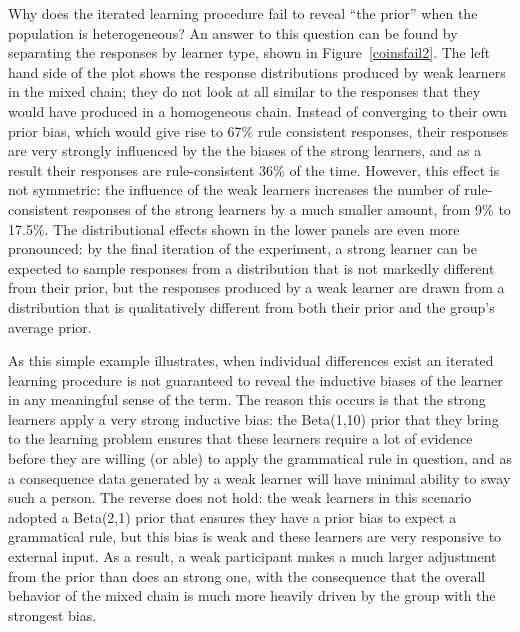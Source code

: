\documentclass[doc]{apa6}
\begin{document}
Why does the iterated learning procedure fail to reveal ``the prior'' when the population is heterogeneous? An answer to this question can be found by separating the responses by learner type, shown in Figure~\ref{coinsfail2}. The left hand side of the plot shows the response distributions produced by {\sc weak} learners in the mixed chain; they do not look at all similar to the responses that they would have produced in a homogeneous chain. Instead of converging to their own prior bias, which would give rise to 67\% rule consistent responses, their responses are very strongly influenced by the the biases of the {\sc strong} learners, and as a result their responses are rule-consistent 36\% of the time. However, this effect is not symmetric: the influence of the {\sc weak} learners increases the number of rule-consistent responses of the {\sc strong} learners by a much smaller amount, from 9\% to 17.5\%. The distributional effects shown in the lower panels are even more pronounced: by the final iteration of the experiment, a {\sc strong} learner can be expected to sample responses from a distribution that is not markedly different from their prior, but the responses produced by a {\sc weak} learner are drawn from a distribution that is qualitatively different from both their prior and the group's average prior.

As this simple example illustrates, when individual differences exist an iterated learning procedure is not guaranteed to reveal the inductive biases of the learner in any meaningful sense of the term. The reason this occurs is that the {\sc strong} learners apply a very strong inductive bias: the Beta(1,10) prior that they bring to the learning problem ensures that these learners require a lot of evidence before they are willing (or able) to apply the grammatical rule in question, and as a consequence data generated by a {\sc weak} learner will have minimal ability to sway such a person. The reverse does not hold: the {\sc weak} learners in this scenario adopted a Beta(2,1) prior that ensures they have a prior bias to expect a grammatical rule, but this bias is weak and these learners are very responsive to external input. As a result, a {\sc weak} participant makes a much larger adjustment from the prior than does an {\sc strong} one, with the consequence that the overall behavior of the mixed chain is much more heavily driven by the group with the strongest bias.
\end{document}
